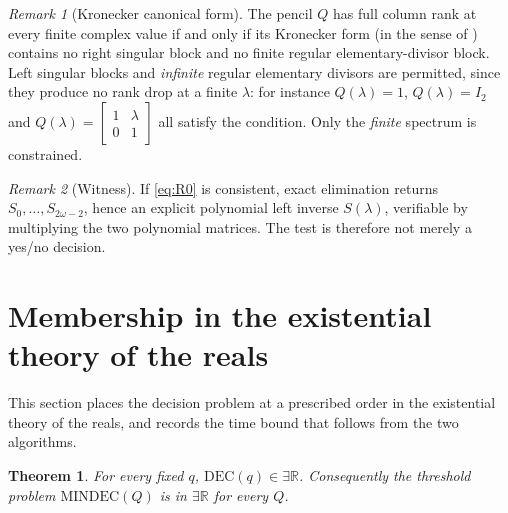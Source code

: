 \documentclass[journal]{IEEEtran}
\theoremstyle{plainn}
\newtheorem{thm}{Theorem}
\theoremstyle{remark}
\newtheorem{remark}{Remark}
\begin{document}
\begin{remark}[Kronecker canonical form]\label{rem:kronecker}
The pencil $Q$ has full column rank at every finite complex value if and only if its Kronecker
form (in the sense of \cite{bee88}) contains no right singular block and no finite regular
elementary-divisor block. Left singular blocks and \emph{infinite} regular elementary divisors are
permitted, since they produce no rank drop at a finite $\lambda$: for instance
$Q(\lambda)=1$, $Q(\lambda)=I_2$ and $Q(\lambda)=\begin{bmatrix}1&\lambda\\0&1\end{bmatrix}$ all
satisfy the condition. Only the \emph{finite} spectrum is constrained.
\end{remark}

\begin{remark}[Witness]\label{rem:witness}
If \eqref{eq:R0} is consistent, exact elimination returns
$S_0,\dots,S_{2\omega-2}$, hence an explicit polynomial left inverse
$S(\lambda)$, verifiable by multiplying the two polynomial matrices. The test is
therefore not merely a yes/no decision.
\end{remark}

\section{Membership in the existential theory of the reals}\label{sec:existsr}

This section places the decision problem at a prescribed order in the existential theory of the reals, and records the time bound that follows from the two algorithms.

\begin{thm}\label{thm:existsr}
For every fixed $q$, $\mathrm{DEC}(q)\in\exists\mathbb R$. Consequently the threshold problem $\mathrm{MINDEC}(Q)$ is in $\exists\mathbb R$ for every $Q$.
\end{thm}
\end{document}
